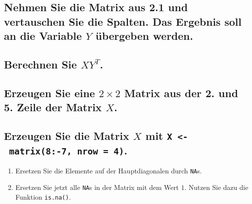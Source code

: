 \documentclass[12pt,a4paper]{article}
\begin{document}
\hypertarget{nehmen-sie-die-matrix-aus-2.1-und-vertauschen-sie-die-spalten.-das-ergebnis-soll-an-die-variable-y-uxfcbergeben-werden.}{%
\subsection{\texorpdfstring{Nehmen Sie die Matrix aus 2.1 und
vertauschen Sie die Spalten. Das Ergebnis soll an die Variable \(Y\)
übergeben
werden.}{Nehmen Sie die Matrix aus 2.1 und vertauschen Sie die Spalten. Das Ergebnis soll an die Variable Y übergeben werden.}}\label{nehmen-sie-die-matrix-aus-2.1-und-vertauschen-sie-die-spalten.-das-ergebnis-soll-an-die-variable-y-uxfcbergeben-werden.}}

\vspace{0.5cm}

\hypertarget{berechnen-sie-xyt.}{%
\subsection{\texorpdfstring{Berechnen Sie
\(XY^{T}\).}{Berechnen Sie XY\^{}\{T\}.}}\label{berechnen-sie-xyt.}}

\vspace{0.5cm}

\hypertarget{erzeugen-sie-eine-2-times-2-matrix-aus-der-2.-und-5.-zeile-der-matrix-x.}{%
\subsection{\texorpdfstring{Erzeugen Sie eine \(2 \times 2\) Matrix aus
der 2. und 5. Zeile der Matrix
\(X\).}{Erzeugen Sie eine 2 \textbackslash times 2 Matrix aus der 2. und 5. Zeile der Matrix X.}}\label{erzeugen-sie-eine-2-times-2-matrix-aus-der-2.-und-5.-zeile-der-matrix-x.}}

\vspace{0.5cm}

\hypertarget{erzeugen-sie-die-matrix-x-mit-x---matrix8-7-nrow-4.}{%
\subsection{\texorpdfstring{Erzeugen Sie die Matrix \(X\) mit
\texttt{X\ \textless{}-\ matrix(8:-7,\ nrow\ =\ 4)}.}{Erzeugen Sie die Matrix X mit X \textless- matrix(8:-7, nrow = 4).}}\label{erzeugen-sie-die-matrix-x-mit-x---matrix8-7-nrow-4.}}

\begin{enumerate}
\def\labelenumi{\arabic{enumi}.}
\item
  Ersetzen Sie die Elemente auf der Hauptdiagonalen durch \texttt{NA}s.
\item
  Ersetzen Sie jetzt alle \texttt{NA}s in der Matrix mit dem Wert \(1\).
  Nutzen Sie dazu die Funktion \texttt{is.na()}.
\end{enumerate}
\end{document}
